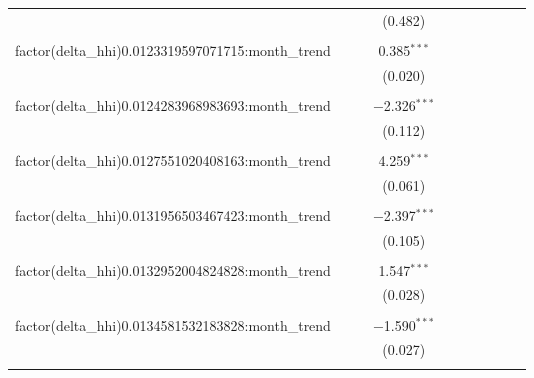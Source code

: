 \begin{table}[H]
{\begin{tabular}{@{\extracolsep{5pt}}lccccccccc}
   &  &  & (0.482) &  &  &  &  &  &  \\  

   & & & & & & & & & \\  

  factor(delta\_hhi)0.0123319597071715:month\_trend &  &  & 0.385$^{***}$ &  &  &  &  &  &  \\  

   &  &  & (0.020) &  &  &  &  &  &  \\  

   & & & & & & & & & \\  

  factor(delta\_hhi)0.0124283968983693:month\_trend &  &  & $-$2.326$^{***}$ &  &  &  &  &  &  \\  

   &  &  & (0.112) &  &  &  &  &  &  \\  

   & & & & & & & & & \\  

  factor(delta\_hhi)0.0127551020408163:month\_trend &  &  & 4.259$^{***}$ &  &  &  &  &  &  \\  

   &  &  & (0.061) &  &  &  &  &  &  \\  

   & & & & & & & & & \\  

  factor(delta\_hhi)0.0131956503467423:month\_trend &  &  & $-$2.397$^{***}$ &  &  &  &  &  &  \\  

   &  &  & (0.105) &  &  &  &  &  &  \\  

   & & & & & & & & & \\  

  factor(delta\_hhi)0.0132952004824828:month\_trend &  &  & 1.547$^{***}$ &  &  &  &  &  &  \\  

   &  &  & (0.028) &  &  &  &  &  &  \\  

   & & & & & & & & & \\  

  factor(delta\_hhi)0.0134581532183828:month\_trend &  &  & $-$1.590$^{***}$ &  &  &  &  &  &  \\  

   &  &  & (0.027) &  &  &  &  &  &  \\  

   & & & & & & & & & \\  


\end{tabular}}
\end{table}
